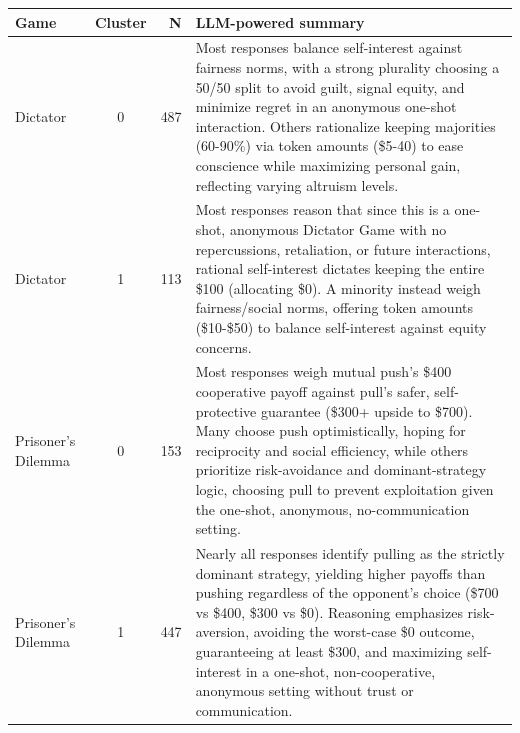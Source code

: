 \begin{center}
\normalsize
\setlength{\tabcolsep}{3pt}
\begin{tabular}{@{}lcrp{}@{}}
\toprule
Game & Cluster & N & LLM-powered summary \\
\midrule
Dictator & 0 & 487 & Most responses balance self-interest against fairness norms, with a strong plurality choosing a 50/50 split to avoid guilt, signal equity, and minimize regret in an anonymous one-shot interaction. Others rationalize keeping majorities (60-90\%) via token amounts (\$5-40) to ease conscience while maximizing personal gain, reflecting varying altruism levels. \\
\addlinespace[0.4em]
Dictator & 1 & 113 & Most responses reason that since this is a one-shot, anonymous Dictator Game with no repercussions, retaliation, or future interactions, rational self-interest dictates keeping the entire \$100 (allocating \$0). A minority instead weigh fairness/social norms, offering token amounts (\$10-\$50) to balance self-interest against equity concerns. \\
\addlinespace[0.4em]
Prisoner's Dilemma & 0 & 153 & Most responses weigh mutual push’s \$400 cooperative payoff against pull’s safer, self-protective guarantee (\$300+ upside to \$700). Many choose push optimistically, hoping for reciprocity and social efficiency, while others prioritize risk-avoidance and dominant-strategy logic, choosing pull to prevent exploitation given the one-shot, anonymous, no-communication setting. \\
\addlinespace[0.4em]
Prisoner's Dilemma & 1 & 447 & Nearly all responses identify pulling as the strictly dominant strategy, yielding higher payoffs than pushing regardless of the opponent's choice (\$700 vs \$400, \$300 vs \$0). Reasoning emphasizes risk-aversion, avoiding the worst-case \$0 outcome, guaranteeing at least \$300, and maximizing self-interest in a one-shot, non-cooperative, anonymous setting without trust or communication. \\
\bottomrule
\end{tabular}
\end{center}
